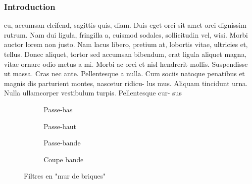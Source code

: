 \documentclass[12pt]{report}
\begin{document}
\subsubsection{Introduction}

eu, accumsan eleifend, sagittis quis, diam. Duis eget orci sit amet orci dignissim rutrum.
Nam dui ligula, fringilla a, euismod sodales, sollicitudin vel, wisi. Morbi auctor lorem
non justo. Nam lacus libero, pretium at, lobortis vitae, ultricies et, tellus. Donec aliquet,
tortor sed accumsan bibendum, erat ligula aliquet magna, vitae ornare odio metus a mi.
Morbi ac orci et nisl hendrerit mollis. Suspendisse ut massa. Cras nec ante. Pellentesque
a nulla. Cum sociis natoque penatibus et magnis dis parturient montes, nascetur ridicu-
lus mus. Aliquam tincidunt urna. Nulla ullamcorper vestibulum turpis. Pellentesque cur-
sus



\begin{figure}[!t]
  \centering
  \begin{subfigure}{.22\linewidth}
    \centering
    \caption{Passe-bas}
    \label{fig2:sub1}
  \end{subfigure}%
  \hfill
  \begin{subfigure}{.22\linewidth}
    \centering
    \caption{Passe-haut}
    \label{fig2:sub2}
  \end{subfigure}\hfill
  \begin{subfigure}{.22\linewidth}
    \centering
    \caption{Passe-bande}
    \label{fig2:sub3}
  \end{subfigure}\hfill
  \begin{subfigure}{.22\linewidth}
    \centering
    \caption{Coupe bande}
    \label{fig2:sub4}
  \end{subfigure}
  \caption{Filtres en "mur de briques"}
  \label{fig:murbrique}
  \end{figure}
\end{document}
